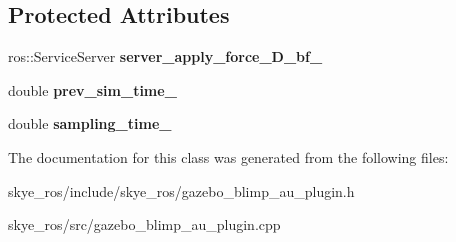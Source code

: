 \subsection*{Protected Attributes}
\begin{DoxyCompactItemize}
\item 
\hypertarget{classgazebo_1_1_gazebo_blimp_au_plugin_a30314d64ec2363f60e074eb2cf1a3a35}{ros\-::\-Service\-Server {\bfseries server\-\_\-apply\-\_\-force\-\_\-D\-\_\-bf\-\_\-}}\label{classgazebo_1_1_gazebo_blimp_au_plugin_a30314d64ec2363f60e074eb2cf1a3a35}

\item 
\hypertarget{classgazebo_1_1_gazebo_blimp_au_plugin_ac06fcb574c0541f9e1a88f38d6504315}{double {\bfseries prev\-\_\-sim\-\_\-time\-\_\-}}\label{classgazebo_1_1_gazebo_blimp_au_plugin_ac06fcb574c0541f9e1a88f38d6504315}

\item 
\hypertarget{classgazebo_1_1_gazebo_blimp_au_plugin_a296655d6cc4027e3919e1ada616c9f54}{double {\bfseries sampling\-\_\-time\-\_\-}}\label{classgazebo_1_1_gazebo_blimp_au_plugin_a296655d6cc4027e3919e1ada616c9f54}

\end{DoxyCompactItemize}


The documentation for this class was generated from the following files\-:\begin{DoxyCompactItemize}
\item 
skye\-\_\-ros/include/skye\-\_\-ros/gazebo\-\_\-blimp\-\_\-au\-\_\-plugin.\-h\item 
skye\-\_\-ros/src/gazebo\-\_\-blimp\-\_\-au\-\_\-plugin.\-cpp\end{DoxyCompactItemize}
